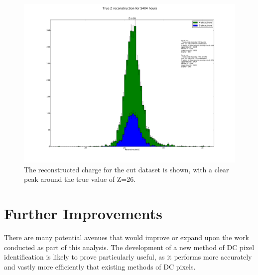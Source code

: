 \documentclass[11pt]{article}
\begin{document}
\begin{figure}
\begin{center}
\includegraphics[width=\textwidth]{Z}
\caption{The reconstructed charge for the cut dataset is shown, with a clear peak around the true value of Z=26.}
\label{fig:Z}
\end{center}
\end{figure}


\section{Further Improvements}
There are many potential avenues that would improve or expand upon the work conducted as part of this analysis. The development of a new method of DC pixel identification is likely to prove particularly useful, as it performs more accurately and vastly more efficiently that existing methods of DC pixels.  
\end{document}

